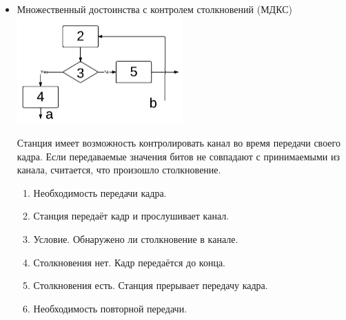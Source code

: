 \documentclass[12pt, russian, oneside, article]{ncc}
\begin{document}
\begin{itemize}
\item Множественный достоинства с контролем столкновений (МДКС)\\
\label{sec-5_1_1_4}%
\includegraphics[width=0.5\textwidth]{images/SiSPI/mdks.png}

Станция имеет возможность контролировать канал во время передачи своего кадра. Если передаваемые значения битов не совпадают с принимаемыми из канала, считается, что произошло столкновение.

\begin{enumerate}
\item Необходимость передачи кадра.
\item Станция передаёт кадр и прослушивает канал.
\item Условие. Обнаружено ли столкновение в канале.
\item Столкновения нет. Кадр передаётся до конца.
\item Столкновения есть. Станция прерывает передачу кадра.
\item Необходимость повторной передачи.
\end{enumerate}

\end{itemize} %
\end{document}
